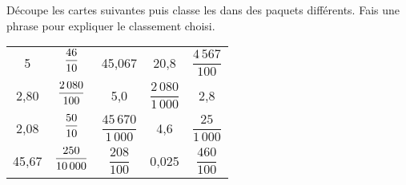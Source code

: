 Découpe les cartes suivantes puis classe les dans des paquets
différents. Fais une phrase pour expliquer le classement choisi.
\par\vspace{-1cm}\par
\begin{center}
  \renewcommand{\arraystretch}{2}
  \begin{tabular}{m{3cm}m{3cm}m{3cm}m{3cm}m{3cm}}
    &&&&\\
    \hline
    \multicolumn{1}{|c|}{5}&\multicolumn{1}{c|}{$\dfrac{46}{\strut10}$}&\multicolumn{1}{c|}{45,067}&\multicolumn{1}{c|}{20,8}&\multicolumn{1}{c|}{$\dfrac{4\,567}{100}$}\\
    \hline
    \multicolumn{1}{|c|}{2,80}&\multicolumn{1}{c|}{$\dfrac{2\,080}{\strut100}$}&\multicolumn{1}{c|}{5,0}&\multicolumn{1}{c|}{$\dfrac{2\,080}{1\,000}$}&\multicolumn{1}{c|}{2,8}\\
    \hline
    \multicolumn{1}{|c|}{2,08}&\multicolumn{1}{c|}{$\dfrac{50}{\strut10}$}&\multicolumn{1}{c|}{$\dfrac{45\,670}{1\,000}$}&\multicolumn{1}{c|}{4,6}&\multicolumn{1}{c|}{$\dfrac{25}{1\,000}$}\\
    \hline
    \multicolumn{1}{|c|}{45,67}&\multicolumn{1}{c|}{$\dfrac{250}{\strut10\,000}$}&\multicolumn{1}{c|}{$\dfrac{208}{100}$}&\multicolumn{1}{c|}{0,025}&\multicolumn{1}{c|}{$\dfrac{460}{100}$}\\
    \hline
  \end{tabular}
  \renewcommand{\arraystretch}{1}
\end{center}
